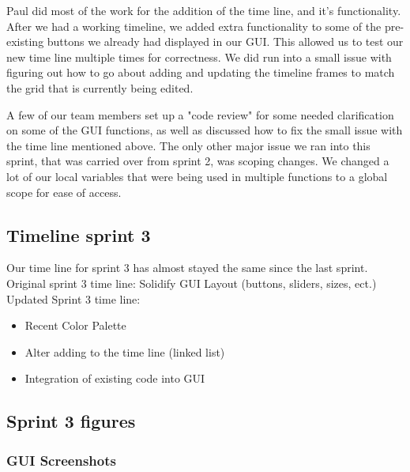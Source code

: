 \documentclass[11pt]{article} %
\begin{document}
{Paul did most of the work for the addition of the time line, and it's functionality. After we had a working timeline, we added extra functionality to some of the pre-existing buttons we already had displayed in our GUI. This allowed us to test our new time line multiple times for correctness. We did run into a small issue with figuring out how to go about adding and updating the timeline frames to match the grid that is currently being edited.

A few of our team members set up a "code review" for some needed clarification on some of the GUI functions, as well as discussed how to fix the small issue with the time line mentioned above. The only other major issue we ran into this sprint, that was carried over from sprint 2, was scoping changes. We changed a lot of our local variables that were being used in multiple functions to a global scope for ease of access.

\subsection{Timeline sprint 3}
%
Our time line for sprint 3 has almost stayed the same since the last sprint. 
Original sprint 3 time line:
Solidify GUI Layout (buttons, sliders, sizes, ect.)\\

\noindent Updated Sprint 3 time line:
\begin{itemize}
	\item Recent Color Palette
	\item Alter adding to the time line (linked list)
	\item Integration of existing code into GUI
\end{itemize}

\newpage
\subsection{Sprint 3 figures}
\subsubsection{GUI Screenshots}

}
\end{document}
